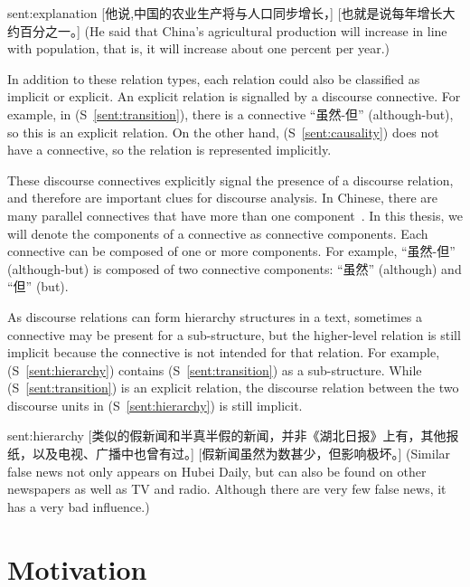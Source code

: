 \begin{sent}{sent:explanation}{}
    [他说,中国的农业生产将与人口同步增长，] [也就是说每年增长大约百分之一。]
    (He said that China's agricultural production will increase in line with
    population, that is, it will increase about one percent per year.)
\end{sent}

In addition to these relation types, each relation could also be classified
as implicit or explicit. An explicit relation is signalled by a discourse connective.
For example, in (S~\ref{sent:transition}), there is a connective ``虽然-但''
(although-but), so this is an explicit relation. On the other hand,
(S~\ref{sent:causality}) does not have a connective, so the relation
is represented implicitly.

These discourse connectives explicitly signal the presence of a discourse relation,
and therefore are important clues for discourse analysis.
In Chinese, there are many parallel connectives that have more than one
component~\citep{zhou2012pdtb}.
In this thesis, we will denote the components of a connective as connective components.
Each connective can be composed of one or more components. For example, ``虽然-但''
(although-but) is composed of two connective components: ``虽然'' (although)
and ``但'' (but).

As discourse relations can form hierarchy structures in a text, sometimes
a connective may be present for a sub-structure, but the higher-level relation
is still implicit because the connective is not intended for that relation.
For example, (S~\ref{sent:hierarchy}) contains (S~\ref{sent:transition})
as a sub-structure. While (S~\ref{sent:transition}) is an explicit relation,
the discourse relation between the two discourse units in (S~\ref{sent:hierarchy})
is still implicit.

\begin{sent}{sent:hierarchy}{}
    [类似的假新闻和半真半假的新闻，并非《湖北日报》上有，其他报纸，以及电视、广播中也曾有过。]
    [假新闻虽然为数甚少，但影响极坏。]
    (Similar false news not only appears on Hubei Daily, but can also be found on
    other newspapers as well as TV and radio.
    Although there are very few false news, it has a very bad influence.)
\end{sent}



%
%
\section{Motivation}

